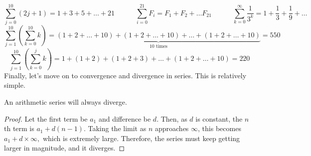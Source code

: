 \documentclass[11pt]{article}
\begin{document}
\[\sum_{j=0}^{10} (2j+1) = 1 + 3 + 5 + \dots + 21 \qquad\quad \sum_{i=0}^{21} F_i = F_1 + F_2 + \dots F_{21}\quad\qquad\sum_{k=0}^{\infty} \frac{1}{3^k} = 1 +\frac{1}{3} + \frac{1}{9} + \dots \]
\[\sum_{j=1}^{10}\left(\sum_{k=0}^{10} k\right) = \underbrace{(1 + 2 + \dots + 10) + (1 + 2 + \dots + 10) + \dots + (1 + 2 + \dots + 10)}_{10 \text{ times}} = 550\]
\[\sum_{j=1}^{10}\left(\sum_{k=0}^{j} k\right) = 1 + (1 + 2) + (1 + 2 +3) + \dots + (1 + 2 + \dots + 10) = 220\]
Finally, let's move on to convergence and divergence in series. This is relatively simple.
\begin{thrm}
	An arithmetic series will always diverge.
\end{thrm}
\begin{proof}
	Let the first term be $a_1$ and difference be $d$. Then, as $d$ is constant, the $n$th term is $a_1 + d(n-1)$. Taking the limit as $n$ approaches $\infty$, this becomes $a_1 + d\times\infty,$ which is extremely large. Therefore, the series must keep getting larger in magnitude, and it diverges.
\end{proof}
\end{document}
